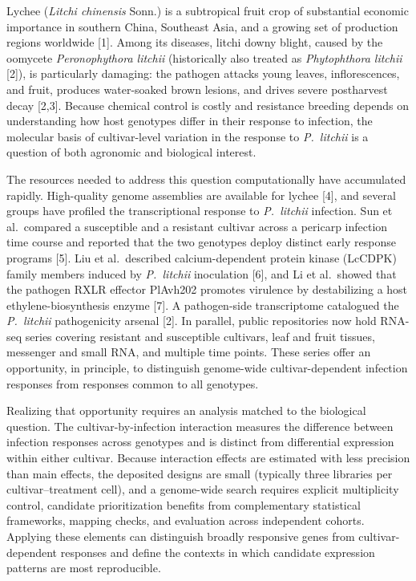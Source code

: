 \documentclass[11pt]{article}
\newcommand{\Pl}{\textit{P.~litchii}}
\begin{document}
Lychee (\textit{Litchi chinensis} Sonn.) is a subtropical fruit crop of substantial economic importance in southern China, Southeast Asia, and a growing set of production regions worldwide [1]. Among its diseases, litchi downy blight, caused by the oomycete \textit{Peronophythora litchii} (historically also treated as \textit{Phytophthora litchii} [2]), is particularly damaging: the pathogen attacks young leaves, inflorescences, and fruit, produces water-soaked brown lesions, and drives severe postharvest decay [2,3]. Because chemical control is costly and resistance breeding depends on understanding how host genotypes differ in their response to infection, the molecular basis of cultivar-level variation in the response to \Pl{} is a question of both agronomic and biological interest.

The resources needed to address this question computationally have accumulated rapidly. High-quality genome assemblies are available for lychee [4], and several groups have profiled the transcriptional response to \Pl{} infection. Sun et al.\ compared a susceptible and a resistant cultivar across a pericarp infection time course and reported that the two genotypes deploy distinct early response programs [5]. Liu et al.\ described calcium-dependent protein kinase (LcCDPK) family members induced by \Pl{} inoculation [6], and Li et al.\ showed that the pathogen RXLR effector PlAvh202 promotes virulence by destabilizing a host ethylene-biosynthesis enzyme [7]. A pathogen-side transcriptome catalogued the \Pl{} pathogenicity arsenal [2]. In parallel, public repositories now hold RNA-seq series covering resistant and susceptible cultivars, leaf and fruit tissues, messenger and small RNA, and multiple time points. These series offer an opportunity, in principle, to distinguish genome-wide cultivar-dependent infection responses from responses common to all genotypes.

Realizing that opportunity requires an analysis matched to the biological question. The cultivar-by-infection interaction measures the difference between infection responses across genotypes and is distinct from differential expression within either cultivar. Because interaction effects are estimated with less precision than main effects, the deposited designs are small (typically three libraries per cultivar--treatment cell), and a genome-wide search requires explicit multiplicity control, candidate prioritization benefits from complementary statistical frameworks, mapping checks, and evaluation across independent cohorts. Applying these elements can distinguish broadly responsive genes from cultivar-dependent responses and define the contexts in which candidate expression patterns are most reproducible.
\end{document}
